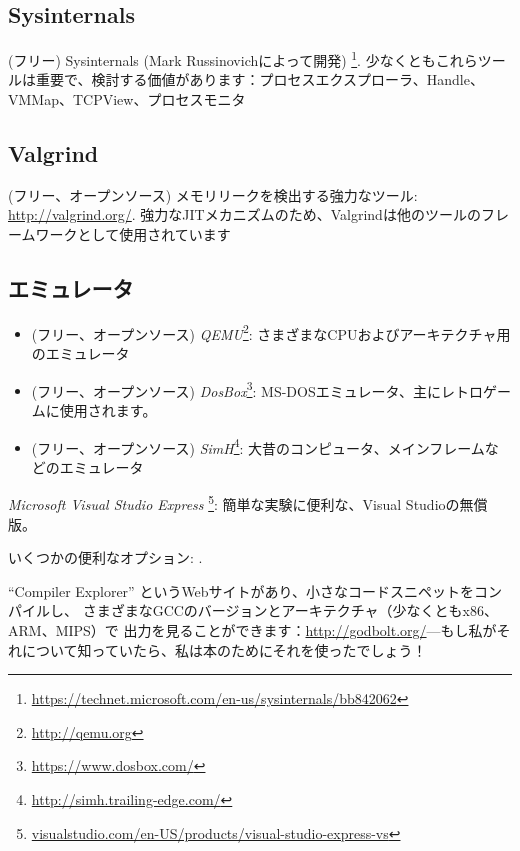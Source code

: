 \subsection{Sysinternals}

(フリー) Sysinternals (Mark Russinovichによって開発)
\footnote{\url{https://technet.microsoft.com/en-us/sysinternals/bb842062}}.
少なくともこれらツールは重要で、検討する価値があります：プロセスエクスプローラ、Handle、VMMap、TCPView、プロセスモニタ

\subsection{Valgrind}

(フリー、オープンソース) メモリリークを検出する強力なツール: \url{http://valgrind.org/}.
強力な\ac{JIT}メカニズムのため、Valgrindは他のツールのフレームワークとして使用されています


\subsection{エミュレータ}

\begin{itemize}
\item (フリー、オープンソース) \emph{QEMU}\footnote{\url{http://qemu.org}}: さまざまなCPUおよびアーキテクチャ用のエミュレータ

\item (フリー、オープンソース) \emph{DosBox}\footnote{\url{https://www.dosbox.com/}}: MS-DOSエミュレータ、主にレトロゲームに使用されます。

\item (フリー、オープンソース) \emph{SimH}\footnote{\url{http://simh.trailing-edge.com/}}: 大昔のコンピュータ、メインフレームなどのエミュレータ
\end{itemize}


\emph{Microsoft Visual Studio Express}
\footnote{\href{http://go.yurichev.com/17034}{visualstudio.com/en-US/products/visual-studio-express-vs}}:
簡単な実験に便利な、Visual Studioの無償版。

いくつかの便利なオプション: .

``Compiler Explorer'' というWebサイトがあり、小さなコードスニペットをコンパイルし、
さまざまなGCCのバージョンとアーキテクチャ（少なくともx86、ARM、MIPS）で
出力を見ることができます：\url{http://godbolt.org/}---もし私がそれについて知っていたら、私は本のためにそれを使ったでしょう！

